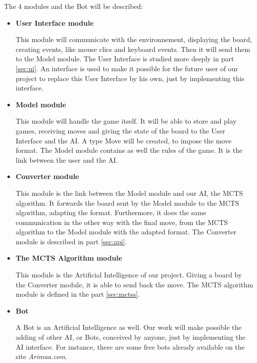 The 4 modules and the Bot will be described:

\begin{itemize}
\item \textbf{User Interface module}

This module will communicate with the environnement, displaying the board, creating events, like mouse clics and keyboard events. Then it will send them to the Model module. The User Interface is studied more deeply in part \ref{sec:ui}. An interface is used to make it possible for the future user of our project to replace this User Interface by his own, just by implementing this interface.

\item \textbf{Model module}

This module will handle the game itself. It will be able to store and play games, receiving moves and giving the state of the board to the User Interface and the AI. A type Move will be created, to impose the move format. The Model module contains as well the rules of the game. It is the link between the user and the AI.

\item \textbf{Converter module}

This module is the link between the Model module and our AI, the MCTS algorithm. It forwards the board sent by the Model module to the MCTS algorithm, adapting the format. Furthermore, it does the same communication in the other way with the final move, from the MCTS algorithm to the Model module with the adapted format. The Converter module is described in part \ref{sec:api}.

\item \textbf{The MCTS Algorithm module}

This module is the Artificial Intelligence of our project. Giving a board by the Converter module, it is able to send back the move. The MCTS algorithm module is defined in the part \ref{sec:mctss}.

\item \textbf{Bot}

A Bot is an Artificial Intelligence as well. Our work will make possible the adding of other AI, or Bots, conceived by anyone, just by implementing the AI interface. For instance, there are some free bots already available on the site \textit{Arimaa.com}.
\end{itemize}